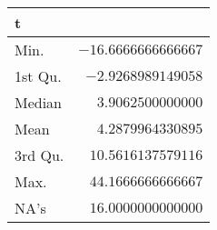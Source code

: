 \begin{table}[!tbp]
\begin{center}
\begin{tabular}{lr}
\hline\hline
\multicolumn{1}{l}{t}&\multicolumn{1}{c}{}\tabularnewline
\hline
Min.&$-16.6666666666667$\tabularnewline
1st Qu.&$ -2.9268989149058$\tabularnewline
Median&$  3.9062500000000$\tabularnewline
Mean&$  4.2879964330895$\tabularnewline
3rd Qu.&$ 10.5616137579116$\tabularnewline
Max.&$ 44.1666666666667$\tabularnewline
NA's&$ 16.0000000000000$\tabularnewline
\hline
\end{tabular}\end{center}
\end{table}
